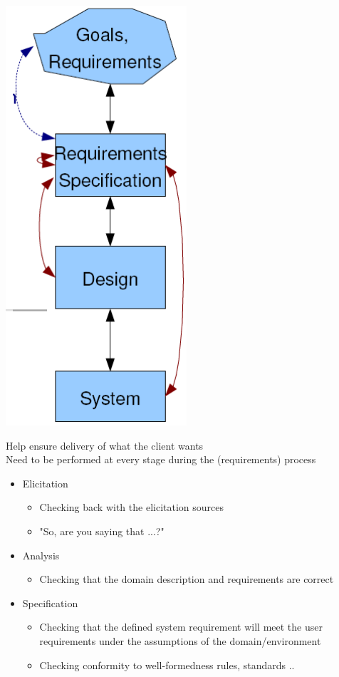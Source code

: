 \documentclass{article}[18pt]
\begin{document}
\begin{minipage}{0.2\textwidth}
\includegraphics[scale=0.7]{validation}
\end{minipage}
Help ensure delivery of what the client wants\\
Need to be performed at every stage during the (requirements) process
\begin{itemize}
	\item Elicitation
	\begin{itemize}
		\item Checking back with the elicitation sources
		\item "So, are you saying that ...?"
	\end{itemize}
	\item Analysis
	\begin{itemize}
		\item Checking that the domain description and requirements are correct
	\end{itemize}
	\item Specification
	\begin{itemize}
		\item Checking that the defined system requirement will meet the user requirements under the assumptions of the domain/environment
		\item Checking conformity to well-formedness rules, standards ..
	\end{itemize}
\end{itemize}
\end{document}
